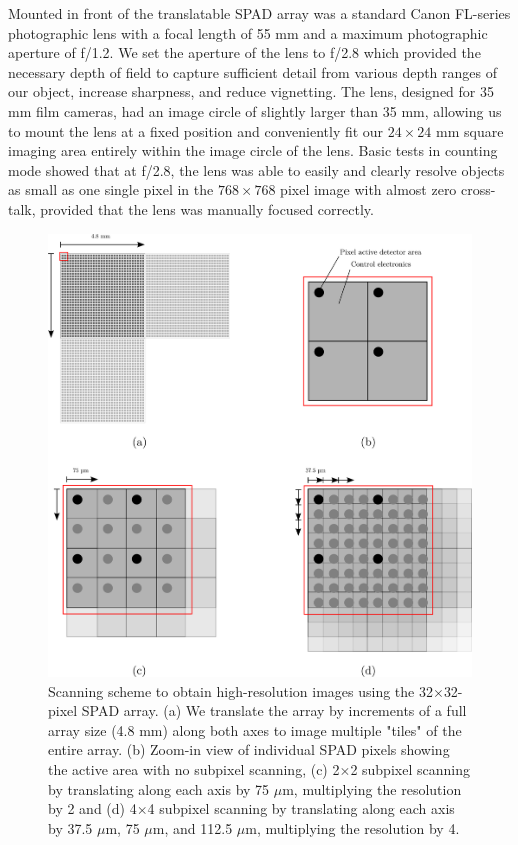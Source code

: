 Mounted in front of the translatable SPAD array was a standard Canon FL-series photographic lens with a focal length of 55 mm and a maximum photographic aperture of f/1.2. We set the aperture of the lens to f/2.8 which provided the necessary depth of field to capture sufficient detail from various depth ranges of our object, increase sharpness, and reduce vignetting. The lens, designed for 35 mm film cameras, had an image circle of slightly larger than 35 mm, allowing us to mount the lens at a fixed position and conveniently fit our $24\times24$ mm square imaging area entirely within the image circle of the lens. Basic tests in counting mode showed that at f/2.8, the lens was able to easily and clearly resolve objects as small as one single pixel in the $768\times768$ pixel image with almost zero cross-talk, provided that the lens was manually focused correctly.

\begin{figure}[h!]
\centerline{\includegraphics[width=15cm]{figure-first-spad-scanning.pdf}}
\caption{Scanning scheme to obtain high-resolution images using the 32$\times$32-pixel SPAD array. (a) We translate the array by increments of a full array size (4.8 mm) along both axes to image multiple "tiles" of the entire array. (b) Zoom-in view of individual SPAD pixels showing the active area with no subpixel scanning, (c) 2$\times$2 subpixel scanning by translating along each axis by 75 $\mu$m, multiplying the resolution by 2 and (d) 4$\times$4 subpixel scanning by translating along each axis by 37.5 $\mu$m, 75 $\mu$m, and 112.5 $\mu$m, multiplying the resolution by 4.}
\label{figure:first-spad-scanning}
\end{figure}

